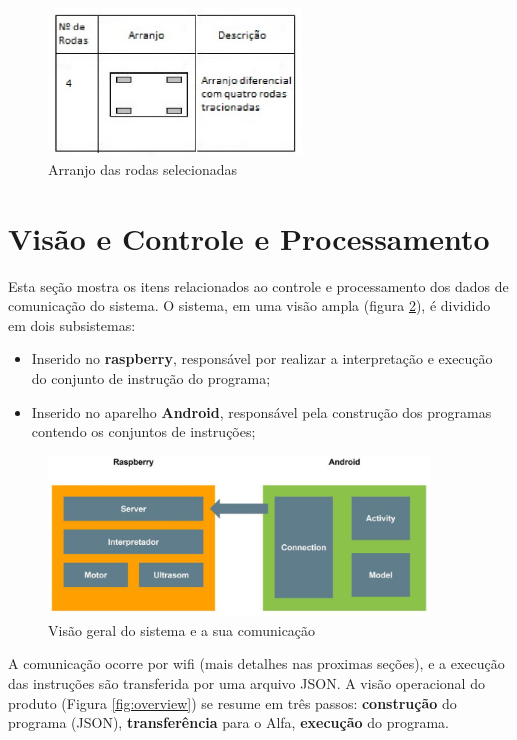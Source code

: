 \begin{figure}[H]
    \centering
    \includegraphics[width=0.6\textwidth]{figuras/arranjo.eps}
    \caption{Arranjo das rodas selecionadas}
    \label{fig:arranjo}
\end{figure}


\section{Visão e Controle e Processamento}

Esta seção mostra os itens relacionados ao controle e processamento dos dados de comunicação do sistema. O sistema, em uma visão ampla
(figura \ref{fig:overview_down}), é dividido em dois subsistemas:

\begin{itemize}
\item Inserido no \textbf{raspberry}, responsável por realizar a interpretação e execução do conjunto de instrução do programa;
\item Inserido no aparelho \textbf{Android}, responsável pela construção dos programas contendo os conjuntos de instruções;
\end{itemize}

\begin{figure}[H]
    \centering
    \includegraphics[width=0.9\textwidth]{figuras/overview_down.eps}
    \caption{Visão geral do sistema e a sua comunicação}
    \label{fig:overview_down}
\end{figure}

A comunicação ocorre por wifi (mais detalhes nas proximas seções), e a execução das instruções são transferida por uma arquivo JSON.
A visão operacional do produto (Figura \ref{fig:overview}) se resume em três passos: \textbf{construção} do programa (JSON), \textbf{transferência}
para o Alfa, \textbf{execução} do programa.


